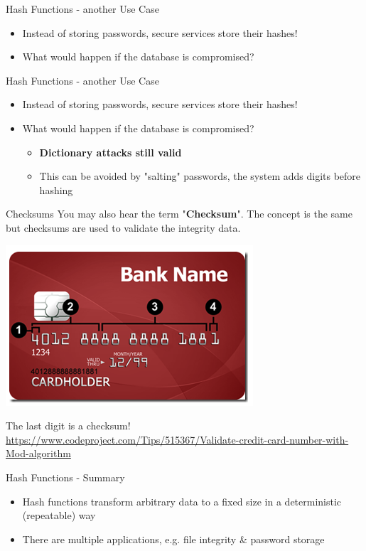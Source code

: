\documentclass{beamer}
\begin{document}
\begin{frame}{Hash Functions - another Use Case}
\begin{itemize}
\item Instead of storing passwords, secure services store their hashes!
\item What would happen if the database is compromised?
\end{itemize}
\end{frame}

\begin{frame}{Hash Functions - another Use Case}
\begin{itemize}
\item Instead of storing passwords, secure services store their hashes!
\item What would happen if the database is compromised?
\begin{itemize}
\item \textbf{Dictionary attacks still valid}
\item This can be avoided by "salting" passwords, the system adds digits before hashing
\end{itemize}
\end{itemize}
\end{frame}

\begin{frame}{Checksums}
You may also hear the term "\textbf{Checksum}". The concept is the same but checksums are used to validate the integrity data. 
\begin{center}
\includegraphics[width=0.45\linewidth]{credit-card.png} \newline
{\footnotesize The last digit is a checksum! \url{https://www.codeproject.com/Tips/515367/Validate-credit-card-number-with-Mod-algorithm} \par}
\end{center}
\end{frame}

\begin{frame}{Hash Functions - Summary}
\begin{itemize}
\item Hash functions transform arbitrary data to a fixed size in a deterministic (repeatable) way
\item There are multiple applications, e.g. file integrity \& password storage
\end{itemize}
\end{frame}
\end{document}

